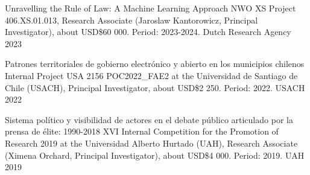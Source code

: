 \begin{cvhonors}
\cvhonor
{Unravelling the Rule of Law: A Machine Learning Approach}
{NWO XS Project 406.XS.01.013, Research Associate (Jaroslaw Kantorowicz, Principal Investigator), about USD\$60 000. Period: 2023-2024.} %
{Dutch Research Agency}
{2023}
\end{cvhonors}

\vspace{1mm}

\begin{cvhonors}
\cvhonor
{Patrones territoriales de gobierno electrónico y abierto en los municipios chilenos}
{Internal Project USA 2156 POC2022\_FAE2 at the Universidad de Santiago de Chile (USACH), Principal Investigator, about USD\$2 250. Period: 2022.} %
{USACH}
{2022}
\end{cvhonors}

\vspace{1mm}

\begin{cvhonors}
\cvhonor
{Sistema político y visibilidad de actores en el debate público articulado por la prensa de élite: 1990-2018}
{XVI Internal Competition for the Promotion of Research 2019 at the Universidad Alberto Hurtado (UAH), Research Associate (Ximena Orchard, Principal Investigator), about USD\$4 000. Period: 2019.} %
{UAH}
{2019}
\end{cvhonors}

\vspace{1mm}


